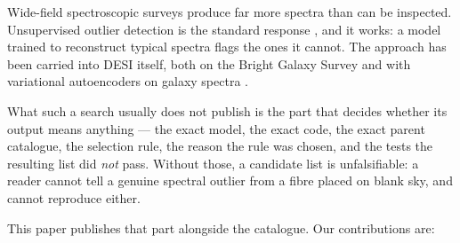 \documentclass[aps,prd,twocolumn,superscriptaddress,nofootinbib,longbibliography,floatfix]{revtex4-2}
\begin{document}
Wide-field spectroscopic surveys produce far more spectra than can be
inspected. Unsupervised outlier detection is the standard response
\cite{BaronPoznanski2017}, and it works: a model trained to reconstruct
typical spectra flags the ones it cannot. The approach has been carried into
DESI itself, both on the Bright Galaxy Survey \cite{Liang2023} and with
variational autoencoders on galaxy spectra \cite{Nicolaou2026}.

What such a search usually does not publish is the part that decides whether
its output means anything --- the exact model, the exact code, the exact
parent catalogue, the selection rule, the reason the rule was chosen, and the
tests the resulting list did \emph{not} pass. Without those, a candidate list
is unfalsifiable: a reader cannot tell a genuine spectral outlier from a
fibre placed on blank sky, and cannot reproduce either.

This paper publishes that part alongside the catalogue. Our contributions
are:
\end{document}
